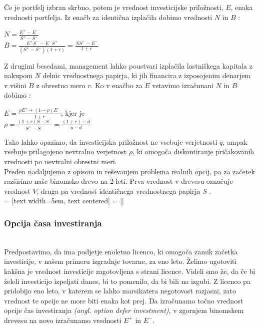 Če je portfelj izbran skrbno, potem je vrednost investicijske priložnosti, $E$, enaka vrednosti portfelja. Iz enačb za identična izplačila dobimo vrednosti $N$ in $B$ \cite[str. 156]{Trigeorgis}:
\begin{center}
$N = \tfrac{E^+ - E^-}{S^+ - S^-}$\\[0,5 cm]
$B = \tfrac{E^+S^- - E^-S^+}{(S^+ - S^-)(1+r)} = \tfrac{NS^- - E^-}{1+r}$\\
\end{center}
Z drugimi besedami, management lahko poustvari izplačila lastniškega kapitala z nakupom $N$ delnic vrednostnega papirja, ki jih financira z izposojenim denarjem v višini $B$ z obrestno mero $r$. Ko v enačbo za $E$ vstavimo izračunani $N$ in $B$ dobimo \cite[str. 156, 157]{Trigeorgis}:
\begin{center}
$E = \tfrac{\rho E^+ + (1-\rho)E^-}{1+r}$, kjer je \\[0,5 cm]
$\rho = \tfrac{(1+r)S - S^-}{S^+ - S^-} = \tfrac{(1+r)-d}{u-d}$
\end{center}
Tako lahko opazimo, da investicijska priložnost ne vsebuje verjetnosti $q$, ampak vsebuje prilagojeno nevtralno verjetnost $\rho$, ki omogoča diskontiranje pričakovanih vrednosti po nevtralni obrestni meri. \\

Preden nadaljujemo z opisom in reševanjem problema realnih opcij, pa za začetek razširimo naše binomsko drevo na 2 leti. Prva vrednost v drevesu označuje vrednost $V$, druga pa vrednost identičnega vrednostnega papirja $S$ \cite[str. 158]{Trigeorgis}. \\[0,5 cm]

 = [text width=5em, text centered]
 = []

\subsubsection{Opcija časa investiranja}
\cite[str. 158, 161]{Trigeorgis}\\
Predpostavimo, da ima podjetje enoletno licenco, ki omogoča zamik začetka investicije, v našem primeru izgradnje tovarne, za eno leto. Želimo ugotoviti kakšna je vrednost investicije zagotovljena s strani licence. Videli smo že, da če bi želeli investicijo izpeljati danes, bi to pomenilo, da bi bili na izgubi. Z licenco pa pridobijo eno leto, v katerem se lahko marsikatera negotovost razjasni, zato vrednost te opcije ne more biti enaka kot prej. Da izračunamo točno vrednost opcije čas investiranja \textit{(angl. option defer investment)}, v zgornjem binomskem drevesu na novo izračunamo vrednosti $E^+$ in $E^-$. 

